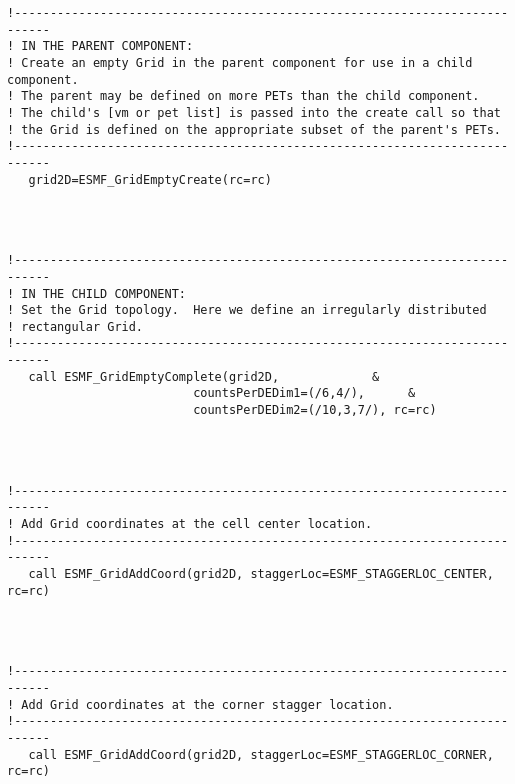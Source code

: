  \begin{verbatim}
!---------------------------------------------------------------------------
! IN THE PARENT COMPONENT:
! Create an empty Grid in the parent component for use in a child component.
! The parent may be defined on more PETs than the child component.
! The child's [vm or pet list] is passed into the create call so that
! the Grid is defined on the appropriate subset of the parent's PETs.
!---------------------------------------------------------------------------
   grid2D=ESMF_GridEmptyCreate(rc=rc)
 
\end{verbatim}
 

 \begin{verbatim}


!---------------------------------------------------------------------------
! IN THE CHILD COMPONENT:
! Set the Grid topology.  Here we define an irregularly distributed
! rectangular Grid.
!---------------------------------------------------------------------------
   call ESMF_GridEmptyComplete(grid2D,             &
                          countsPerDEDim1=(/6,4/),      &
                          countsPerDEDim2=(/10,3,7/), rc=rc)
 
\end{verbatim}
 

 \begin{verbatim}


!---------------------------------------------------------------------------
! Add Grid coordinates at the cell center location.
!---------------------------------------------------------------------------
   call ESMF_GridAddCoord(grid2D, staggerLoc=ESMF_STAGGERLOC_CENTER, rc=rc)
 
\end{verbatim}
 

 \begin{verbatim}


!---------------------------------------------------------------------------
! Add Grid coordinates at the corner stagger location.
!---------------------------------------------------------------------------
   call ESMF_GridAddCoord(grid2D, staggerLoc=ESMF_STAGGERLOC_CORNER, rc=rc)
 
\end{verbatim}
 
